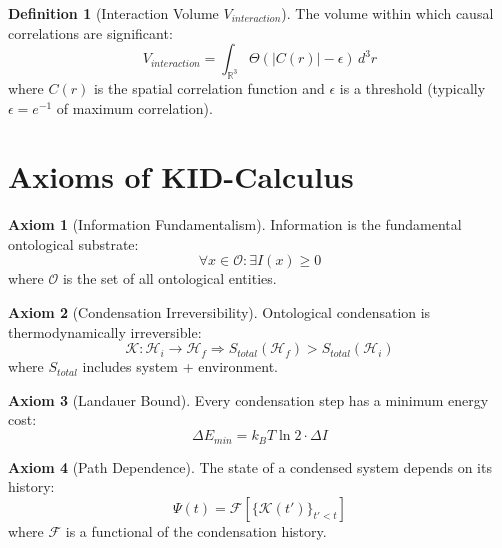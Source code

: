 \documentclass[11pt,a4paper]{article}
\theoremstyle{definition}
\newtheorem{definition}{Definition}[section]
\newtheorem{axiom}{Axiom}[section]
\begin{document}
\begin{definition}[Interaction Volume $V_{interaction}$]
The volume within which causal correlations are significant:
\begin{equation}
V_{interaction} = \int_{\mathbb{R}^3} \Theta(|C(r)| - \epsilon) \, d^3r
\end{equation}
where $C(r)$ is the spatial correlation function and $\epsilon$ is a threshold (typically $\epsilon = e^{-1}$ of maximum correlation).
\end{definition}

\section{Axioms of KID-Calculus}

\begin{axiom}[Information Fundamentalism]
Information is the fundamental ontological substrate:
\begin{equation}
\forall x \in \mathcal{O}: \exists I(x) \geq 0
\end{equation}
where $\mathcal{O}$ is the set of all ontological entities.
\end{axiom}

\begin{axiom}[Condensation Irreversibility]
Ontological condensation is thermodynamically irreversible:
\begin{equation}
\mathcal{K}: \mathcal{H}_i \rightarrow \mathcal{H}_f \Rightarrow S_{total}(\mathcal{H}_f) > S_{total}(\mathcal{H}_i)
\end{equation}
where $S_{total}$ includes system + environment.
\end{axiom}

\begin{axiom}[Landauer Bound]
Every condensation step has a minimum energy cost:
\begin{equation}
\Delta E_{min} = k_B T \ln 2 \cdot \Delta I
\end{equation}
\end{axiom}

\begin{axiom}[Path Dependence]
The state of a condensed system depends on its history:
\begin{equation}
\Psi(t) = \mathcal{F}[\{\mathcal{K}(t')\}_{t' < t}]
\end{equation}
where $\mathcal{F}$ is a functional of the condensation history.
\end{axiom}
\end{document}
